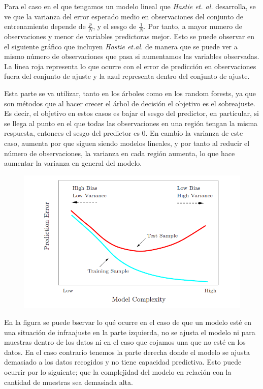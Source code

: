 \noindent Para el caso en el que tengamos un modelo lineal que \emph{Hastie et. al.} \cite {Hastie 2001} desarrolla, se ve que la varianza del error esperado medio en observaciones del conjunto de entrenamiento depende de $\frac{p}{N}$, y el sesgo de $\frac{1}{N}$. Por tanto, a mayor numero de observaciones y menor de variables predictoras mejor. Esto se puede observar en el siguiente gráfico que incluyen \emph{Hastie et.al.} \cite{Hastie 2001} de manera que se puede ver a mismo número de observaciones que pasa si aumentamos las variables observadas. La línea roja representa lo que ocurre con el error de predicción en observaciones fuera del conjunto de ajuste y la azul representa dentro del conjunto de ajuste. 

\noindent Esta parte se va utilizar, tanto en los árboles como en los random forests, ya que son métodos que al hacer crecer el árbol de decisión el objetivo es el sobreajuste. Es decir, el objetivo en estos casos es bajar el sesgo del predictor, en particular, si se llega al punto en el que todas las observaciones en una región tengan la misma respuesta, entonces el sesgo del predictor es 0. En cambio la varianza de este caso, aumenta por que siguen siendo modelos lineales, y por tanto al reducir el número de observaciones, la varianza en cada región aumenta, lo que hace aumentar la varianza en general del modelo. 

\begin{figure}[h]
\centering
\includegraphics[scale=0.4]{Documentos Extra/Imagenes/Bias-Variance-Tradeoff.png}
\end{figure}
 
\noindent En la figura se puede bservar lo qué ocurre en el caso de que un modelo esté en una situación de infraajuste en la parte izquierda, no se ajusta el modelo ni para muestras dentro de los datos ni en el caso que cojamos una que no esté en los datos. En el caso contrario tenemos la parte derecha donde el modelo se ajusta demasiado a los datos recogidos y no tiene capacidad predictiva. Esto puede ocurrir por lo siguiente; que la complejidad del modelo en relación con la cantidad de muestras sea demasiada alta. 

